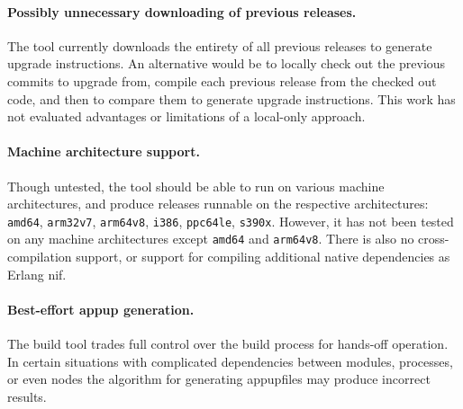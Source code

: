 \paragraph{Possibly unnecessary downloading of previous releases.} The tool currently downloads the entirety of all previous releases to generate upgrade instructions. An alternative would be to locally check out the previous commits to upgrade from, compile each previous release from the checked out code, and then to compare them to generate upgrade instructions. This work has not evaluated advantages or limitations of a local-only approach.

\paragraph{Machine architecture support.} Though untested, the tool should be able to run on various machine architectures, and produce releases runnable on the respective architectures: \lstinline|amd64|, \lstinline|arm32v7|, \lstinline|arm64v8|, \lstinline|i386|, \lstinline|ppc64le|, \lstinline|s390x|. However,  it has not been tested on any machine architectures except \lstinline|amd64| and \lstinline|arm64v8|. There is also no cross-compilation support, or support for compiling additional native dependencies as Erlang \acrfull{nif}.

\paragraph{Best-effort \acrshort{appup} generation.} The build tool trades full control over the build process for hands-off operation. In certain situations with complicated dependencies between modules, processes, or even nodes the algorithm for generating \acrfull{appup}files may produce incorrect results.

